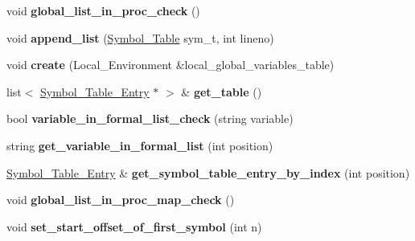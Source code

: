 \begin{DoxyCompactItemize}
\item 
\mbox{\label{classSymbol__Table_a43e13fb5e7caffb52bbcad13fb72e52f}} 
void {\bfseries global\+\_\+list\+\_\+in\+\_\+proc\+\_\+check} ()
\item 
\mbox{\label{classSymbol__Table_a54091a1ce462439a87dfe43bdc4469b4}} 
void {\bfseries append\+\_\+list} (\hyperlink{classSymbol__Table}{Symbol\+\_\+\+Table} sym\+\_\+t, int lineno)
\item 
\mbox{\label{classSymbol__Table_a28c77172f5d5c28200a8531cdc8a8280}} 
void {\bfseries create} (Local\+\_\+\+Environment \&local\+\_\+global\+\_\+variables\+\_\+table)
\item 
\mbox{\label{classSymbol__Table_a9c11ba9753ab576f4f18933f3f0f1846}} 
list$<$ \hyperlink{classSymbol__Table__Entry}{Symbol\+\_\+\+Table\+\_\+\+Entry} $\ast$ $>$ \& {\bfseries get\+\_\+table} ()
\item 
\mbox{\label{classSymbol__Table_a430c6d272d2519bfa0c8b8be52bfaa07}} 
bool {\bfseries variable\+\_\+in\+\_\+formal\+\_\+list\+\_\+check} (string variable)
\item 
\mbox{\label{classSymbol__Table_a3401a800f09cfed778542644ef07b951}} 
string {\bfseries get\+\_\+variable\+\_\+in\+\_\+formal\+\_\+list} (int position)
\item 
\mbox{\label{classSymbol__Table_a2f078d75d545972e96ef6003cc857b31}} 
\hyperlink{classSymbol__Table__Entry}{Symbol\+\_\+\+Table\+\_\+\+Entry} \& {\bfseries get\+\_\+symbol\+\_\+table\+\_\+entry\+\_\+by\+\_\+index} (int position)
\item 
\mbox{\label{classSymbol__Table_aa35b65adcc2445ba39aced5e9ec39eb3}} 
void {\bfseries global\+\_\+list\+\_\+in\+\_\+proc\+\_\+map\+\_\+check} ()
\item 
\mbox{\label{classSymbol__Table_a8c0e1203989942ce5a4b98dd52438631}} 
void {\bfseries set\+\_\+start\+\_\+offset\+\_\+of\+\_\+first\+\_\+symbol} (int n)
\item 
\mbox{\label{classSymbol__Table_a7416150706e30f561a19a43b807a0d50}} 

\end{DoxyCompactItemize}
